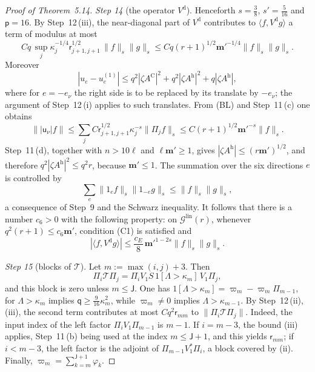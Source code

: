 \documentclass[11pt,letterpaper,reqno]{amsart}
\theoremstyle{definition}
\begin{document}
\begin{proof}[Proof of Theorem~5.14]
\emph{Step 14} (the operator $V^{\mathrm d}$).
Henceforth $s=\frac38$, $s'=\frac5{16}$ and $\mathsf p=16$.
By Step~12\,(iii), the near-diagonal part of $V^{\mathrm d}$ contributes to $\langle f,V^{\mathrm d}g\rangle$ a term of modulus at most
\begin{equation*}
Cq\,\sup_j\kappa_j^{-1/4}\mathsf r_{j+1,j+1}^{1/2}\,\|f\|_s\|g\|_s\le Cq(r+1)^{1/2}\mathbf m'^{-1/4}\|f\|_s\|g\|_s.
\end{equation*}
Moreover
\begin{equation*}
|u_e-u_e^{(1)}|\le q^2|\zeta A^{\mathrm C}|^2+q^2|\zeta A^{\mathrm h}|^2+q|\zeta A^{\mathrm h}|,
\end{equation*}
where for $e=-e_\nu$ the right side is to be replaced by its translate by $-e_\nu$; the argument of Step~12\,(i) applies to such translates.
From (BL) and Step~11\,(c) one obtains
\begin{equation*}
\bigl\||\mathsf u_\nu|f\bigr\|\le\sum_jC\mathsf r_{j+1,j+1}^{1/2}\kappa_j^{-s}\|\Pi_jf\|_s\le C(r+1)^{1/2}\mathbf m'^{-s}\|f\|_s.
\end{equation*}
Step~11\,(d), together with $n>10\ell$ and $\ell\mathbf m'\ge1$, gives $|\zeta A^{\mathrm h}|\le(r\mathbf m')^{1/2}$, and therefore $q^2|\zeta A^{\mathrm h}|^2\le q^2r$, because $\mathbf m'\le1$.
The summation over the six directions $e$ is controlled by
\begin{equation*}
\sum_e\|1_ef\|_s\|1_{-e}g\|_s\le\|f\|_s\|g\|_s,
\end{equation*}
a consequence of Step~9 and the Schwarz inequality.
It follows that there is a number $c_6>0$ with the following property: on $\mathcal G^{\mathrm{lin}}(r)$, whenever $q^2(r+1)\le c_6\mathbf m'$, condition (C1) is satisfied and
\begin{equation*}
|\langle f,V^{\mathrm d}g\rangle|\le\frac{c_E}{8}\,\mathbf m'^{1-2s}\|f\|_s\|g\|_s.
\end{equation*}

\emph{Step 15} (blocks of $\mathcal T$).
Let $m:=\max(i,j)+3$.
Then
\begin{equation*}
\Pi_i\mathcal T\Pi_j=\Pi_iV_1S\,1[\Lambda>\kappa_m]\,V_1\Pi_j,
\end{equation*}
and this block is zero unless $m\le\mathsf J$.
One has $1[\Lambda>\kappa_m]=\varpi_m-\varpi_m\Pi_{m-1}$, for $\Lambda>\kappa_m$ implies $\mathsf q\ge\frac9{16}\kappa_m^2$, while $\varpi_m\ne0$ implies $\Lambda>\kappa_{m-1}$.
By Step~12\,(ii), (iii), the second term contributes at most $Cq^2\mathsf r_{mm}$ to $\|\Pi_i\mathcal T\Pi_j\|$.
Indeed, the input index of the left factor $\Pi_iV_1\Pi_{m-1}$ is $m-1$.
If $i=m-3$, the bound (iii) applies, Step~11\,(b) being used at the index $m\le\mathsf J+1$, and this yields $\mathsf r_{mm}$; if $i<m-3$, the left factor is the adjoint of $\Pi_{m-1}V_1^*\Pi_i$, a block covered by (ii).
Finally, $\varpi_m=\sum_{k=m}^{\mathsf J+1}\varphi_k$.


\end{proof}
\end{document}

